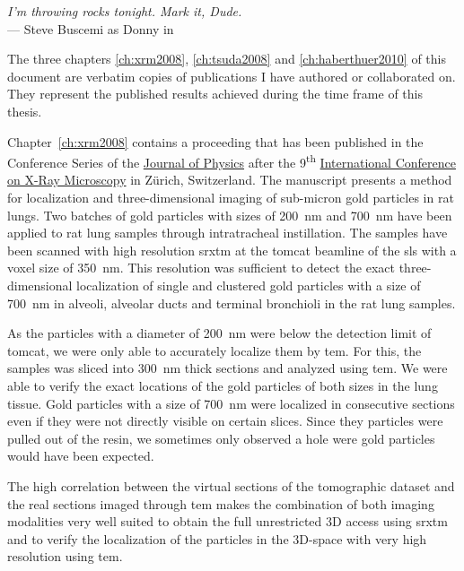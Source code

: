 \acresetall
{}
\label{ch:publications}
\begin{flushright}{\slshape I'm throwing rocks tonight. Mark it, Dude.} \\ \medskip
    --- Steve Buscemi as Donny in \citep{TheBigLebowski}
\end{flushright}
\vspace{52mm}

The three chapters \ref{ch:xrm2008}, \ref{ch:tsuda2008} and \ref{ch:haberthuer2010} of this document are verbatim copies of publications I have authored or collaborated on. They represent the published results achieved during the time frame of this thesis.

Chapter~\ref{ch:xrm2008} contains a proceeding that has been published in the Conference Series of the \href{http://iopscience.iop.org/1742-6596/}{Journal of Physics} after the 9\textsuperscript{th} \href{http://xrm2008.web.psi.ch/}{International Conference on X-Ray Microscopy} in Zürich, Switzerland. The manuscript presents a method for localization and three-dimensional imaging of sub-micron gold particles in rat lungs. Two batches of gold particles with sizes of \SI{200}{\nano\meter} and \SI{700}{\nano\meter} have been applied to rat lung samples through intratracheal instillation. The samples have been scanned with high resolution \ac{srxtm} at the \ac{tomcat} beamline of the \ac{sls} with a voxel size of \SI{350}{\nano\meter}. This resolution was sufficient to detect the exact three-dimensional localization of single and clustered gold particles with a size of \SI{700}{\nano\meter} in alveoli, alveolar ducts and terminal bronchioli in the rat lung samples. 

As the particles with a diameter of \SI{200}{\nano\meter} were below the detection limit of \ac{tomcat}, we were only able to accurately localize them by \ac{tem}. For this, the samples was sliced into \SI{300}{\nano\meter} thick sections and analyzed using \ac{tem}. We were able to verify the exact locations of the gold particles of both sizes in the lung tissue. Gold particles with a size of \SI{700}{\nano\meter} were localized in consecutive sections even if they were not directly visible on certain slices. Since they particles were pulled out of the resin, we sometimes only observed a hole were gold particles would have been expected.

The high correlation between the virtual sections of the tomographic dataset and the real sections imaged through \ac{tem} makes the combination of both imaging modalities very well suited to obtain the full unrestricted 3D access using \ac{srxtm} and to verify the localization of the particles in the 3D-space with very high resolution using \ac{tem}.

